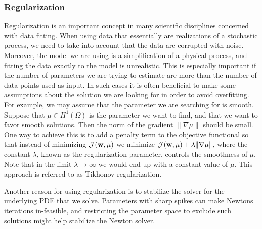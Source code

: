 \subsubsection{Regularization}
\label{sec:intro_regularization}
Regularization is an important concept in many scientific disciplines
concerned with data fitting. When using data that essentially are
realizations of a stochastic process, we need to take into account
that the data are corrupted with noise. Moreover, the model we are using
is a simplification of a physical process, and fitting the
data exactly to the model is unrealistic. This is especially
important if the number of parameters we are trying to estimate are
more than the number of data points used as input. In such cases it is often
beneficial to make some assumptions about the solution we are looking
for in order to avoid overfitting. For example, we may assume that the
parameter we are searching for is smooth. Suppose that $\mu \in
H^1(\Omega)$ is the parameter we want to find, and that we want to
favor smooth solutions. Then the norm of the gradient $\| \nabla \mu
\|$ should be small. One way to achieve this is to add a penalty term
to the objective functional so that instead of minimizing
$\mathcal{J}(\mathbf{w}, \mu)$ we minimize $\mathcal{J}(\mathbf{w}, \mu) +
\lambda \| \nabla \mu\|$, where the constant $\lambda$, known as the
regularization parameter, controls the smoothness of $\mu$.
Note that in the limit $\lambda \rightarrow \infty$ we would end up
with a constant value of $\mu$. This approach is referred to as Tikhonov
regularization.

Another reason for using regularization is to stabilize the solver for
the underlying PDE that we solve. Parameters with sharp spikes
can make Newtons iterations in-feasible, and restricting the
parameter space to exclude such solutions might help stabilize the
Newton solver. 






